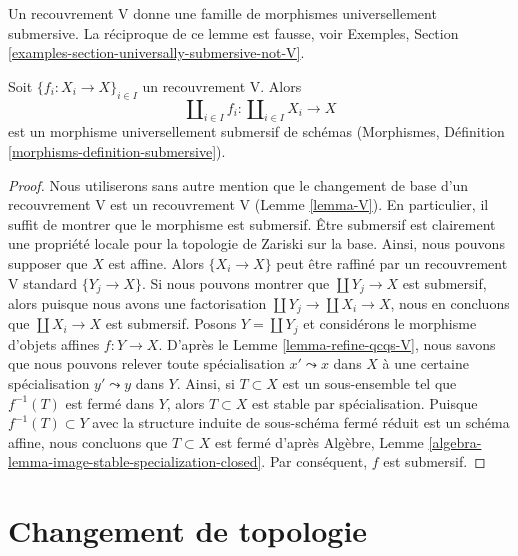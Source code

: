 \noindent
Un recouvrement V donne une famille de morphismes universellement submersive. La réciproque de ce lemme est fausse, voir Exemples, Section \ref{examples-section-universally-submersive-not-V}.

\begin{lemma}
\label{lemma-V-covering-universally-submersive}
Soit $\{f_i : X_i \to X\}_{i \in I}$ un recouvrement V. Alors
$$
\coprod\nolimits_{i \in I} f_i :
\coprod\nolimits_{i \in I} X_i
\longrightarrow
X
$$
est un morphisme universellement submersif de schémas (Morphismes, Définition \ref{morphisms-definition-submersive}).
\end{lemma}

\begin{proof}
Nous utiliserons sans autre mention que le changement de base d'un recouvrement V est un recouvrement V (Lemme \ref{lemma-V}). En particulier, il suffit de montrer que le morphisme est submersif. Être submersif est clairement une propriété locale pour la topologie de Zariski sur la base. Ainsi, nous pouvons supposer que $X$ est affine. Alors $\{X_i \to X\}$ peut être raffiné par un recouvrement V standard $\{Y_j \to X\}$. Si nous pouvons montrer que $\coprod Y_j \to X$ est submersif, alors puisque nous avons une factorisation $\coprod Y_j \to \coprod X_i \to X$, nous en concluons que $\coprod X_i \to X$ est submersif. Posons $Y = \coprod Y_j$ et considérons le morphisme d'objets affines $f : Y \to X$. D'après le Lemme \ref{lemma-refine-qcqs-V}, nous savons que nous pouvons relever toute spécialisation $x' \leadsto x$ dans $X$ à une certaine spécialisation $y' \leadsto y$ dans $Y$. Ainsi, si $T \subset X$ est un sous-ensemble tel que $f^{-1}(T)$ est fermé dans $Y$, alors $T \subset X$ est stable par spécialisation. Puisque $f^{-1}(T) \subset Y$ avec la structure induite de sous-schéma fermé réduit est un schéma affine, nous concluons que $T \subset X$ est fermé d'après Algèbre, Lemme \ref{algebra-lemma-image-stable-specialization-closed}. Par conséquent, $f$ est submersif.
\end{proof}






















\section{Changement de topologie}
\label{section-change-topologies}


